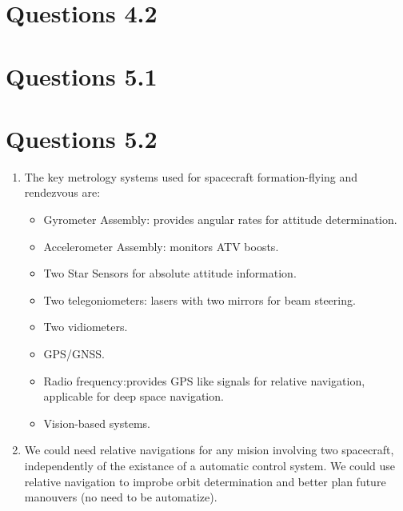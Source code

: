 \documentclass[a4paper]{article}
\begin{document}
\section{Questions 4.2}

\section{Questions 5.1}

\section{Questions 5.2}
\begin{enumerate}[label=\emph{\alph*)}]
  \item %
    The key metrology systems used for spacecraft formation-flying and rendezvous are:
    \begin{itemize}
      \item Gyrometer Assembly: provides angular rates for attitude determination.
      \item Accelerometer Assembly: monitors ATV boosts.
      \item Two Star Sensors for absolute attitude information.
      \item Two telegoniometers: lasers with two mirrors for beam steering.
      \item Two vidiometers.
      \item GPS/GNSS.
      \item Radio frequency:provides GPS like signals for relative navigation, applicable for deep space navigation.
      \item Vision-based systems.
    \end{itemize}

  \item %
    We could need relative navigations for any mision involving two spacecraft, independently of the existance of a automatic control system. We could use relative navigation to improbe orbit determination and better plan future manouvers (no need to be automatize).


\end{enumerate}
\end{document}
